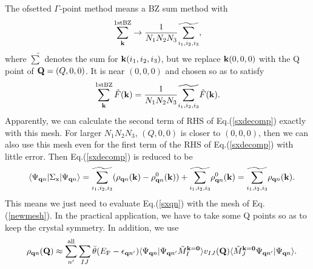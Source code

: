 \documentclass[a4paper,10pt,epsf,fleqn]{article}
\begin{document}
The ofsetted $\Gamma$-point method means a BZ sum method with
\begin{eqnarray}
\sum_{\bf k}^{\rm 1st BZ} \to \frac{1}{N_1N_2N_3} \widetilde{\sum_{i_1,i_2,i_3}} \label{newmesh},
\end{eqnarray}
where $\widetilde{\sum}$ denotes the sum for ${\bf k}(i_1,i_2,i_3)$, but we
replace ${\bf k}(0,0,0)$ with the Q point of ${\bf Q}=(Q,0,0)$.
It is near $(0,0,0)$ and chosen so as to satisfy
\begin{eqnarray}
\sum_{\bf k}^{\rm 1st BZ} \tilde{F}({\bf k}) =
\frac{1}{N_1N_2N_3} \widetilde{\sum_{i_1,i_2,i_3}} \tilde{F}({\bf k}).
\end{eqnarray}
Apparently, we can calculate the second term of RHS of
Eq.(\ref{sxdecomp}) exactly with this mesh.
For larger $N_1N_2N_3$, $(Q,0,0)$ is closer to $(0,0,0)$,
then we can also use this mesh even for the first term of the RHS of Eq.(\ref{sxdecomp}) 
with little error.
Then Eq.(\ref{sxdecomp}) is reduced to be
\begin{eqnarray}
&&\langle \Psi_{{\bf q}n}|\Sigma_{\rm x} |\Psi_{{\bf q}n} \rangle
= \widetilde{\sum_{i_1,i_2,i_3}} (\rho_{{\bf q}n}({\bf k}) - \rho^0_{{\bf q}n}({\bf k})) 
 +\widetilde{\sum_{i_1,i_2,i_3}} \rho^0_{{\bf q}n}({\bf k})= \widetilde{\sum_{i_1,i_2,i_3}} \rho_{{\bf q}n}({\bf k}).
\end{eqnarray}
This means we just need to evaluate Eq.(\ref{sxqn}) with the mesh of Eq.(\ref{newmesh}).
In the practical application, we have to take some Q points so as to keep
the crystal symmetry. In addition, we use
\begin{eqnarray}
&&\rho_{{\bf q}n}({\bf Q}) \approx \sum^{\rm  all}_{n'} \sum_{IJ}
\bar{\theta}(E_{\rm F}-\epsilon_{{\bf q} n'})
\langle \Psi_{{\bf q}n}| \Psi_{{\bf q}n'} \tilde{M}^{\bf k=0}_I \rangle v_{IJ}({\bf Q})
\langle \tilde{M}^{\bf k=0}_J \Psi_{{\bf q}n'} | \Psi_{{\bf q}n} \rangle.
\end{eqnarray}
\end{document}
